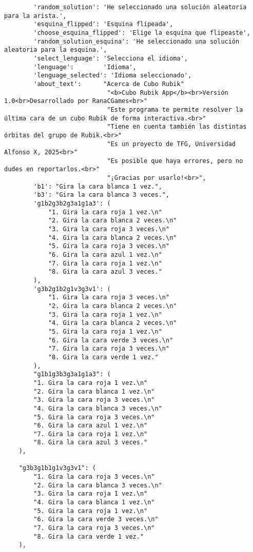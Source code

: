 \begin{lstlisting}
        'random_solution': 'He seleccionado una solución aleatoria para la arista.',
        'esquina_flipped': 'Esquina flipeada',
        'choose_esquina_flipped': 'Elige la esquina que flipeaste',
        'random_solution_esquina': 'He seleccionado una solución aleatoria para la esquina.',
        'select_lenguage': 'Selecciona el idioma',
        'lenguage':        'Idioma',
        'lenguage_selected': 'Idioma seleccionado',
        'about_text':      "Acerca de Cubo Rubik"
                            "<b>Cubo Rubik App</b><br>Versión 1.0<br>Desarrollado por RanaCGames<br>"
                            "Este programa te permite resolver la última cara de un cubo Rubik de forma interactiva.<br>"
                            "Tiene en cuenta también las distintas órbitas del grupo de Rubik.<br>"
                            "Es un proyecto de TFG, Universidad Alfonso X, 2025<br>"
                            "Es posible que haya errores, pero no dudes en reportarlos.<br>"
                            "¡Gracias por usarlo!<br>",
        'b1': "Gira la cara blanca 1 vez.",
        'b3': "Gira la cara blanca 3 veces.",
        'g1b2g3b2g3a1g1a3': (
            "1. Gira la cara roja 1 vez.\n"
            "2. Gira la cara blanca 2 veces.\n"
            "3. Gira la cara roja 3 veces.\n"
            "4. Gira la cara blanca 2 veces.\n"
            "5. Gira la cara roja 3 veces.\n"
            "6. Gira la cara azul 1 vez.\n"
            "7. Gira la cara roja 1 vez.\n"
            "8. Gira la cara azul 3 veces."
        ),
        'g3b2g1b2g1v3g3v1': (
            "1. Gira la cara roja 3 veces.\n"
            "2. Gira la cara blanca 2 veces.\n"
            "3. Gira la cara roja 1 vez.\n"
            "4. Gira la cara blanca 2 veces.\n"
            "5. Gira la cara roja 1 vez.\n"
            "6. Gira la cara verde 3 veces.\n"
            "7. Gira la cara roja 3 veces.\n"
            "8. Gira la cara verde 1 vez."
        ),
        "g1b1g3b3g3a1g1a3": (
        "1. Gira la cara roja 1 vez.\n"
        "2. Gira la cara blanca 1 vez.\n"
        "3. Gira la cara roja 3 veces.\n"
        "4. Gira la cara blanca 3 veces.\n"
        "5. Gira la cara roja 3 veces.\n"
        "6. Gira la cara azul 1 vez.\n"
        "7. Gira la cara roja 1 vez.\n"
        "8. Gira la cara azul 3 veces."
    ),
    
    "g3b3g1b1g1v3g3v1": (
        "1. Gira la cara roja 3 veces.\n"
        "2. Gira la cara blanca 3 veces.\n"
        "3. Gira la cara roja 1 vez.\n"
        "4. Gira la cara blanca 1 vez.\n"
        "5. Gira la cara roja 1 vez.\n"
        "6. Gira la cara verde 3 veces.\n"
        "7. Gira la cara roja 3 veces.\n"
        "8. Gira la cara verde 1 vez."
    ),
    

\end{lstlisting}
